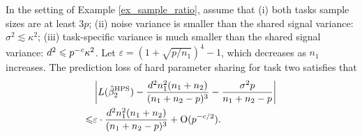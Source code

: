 \begin{corollary}\label{cor_MTL_loss}
	In the setting of Example \ref{ex_sample_ratio}, assume that
	(i) both tasks sample sizes are at least $3p$;
	(ii) noise variance is smaller than the shared signal variance: $\sigma^2 \lesssim  \kappa^2$;
	(iii) task-specific variance is much smaller than the shared signal variance: $d^2 \leqslant p^{-{\mathit{c}}}{\kappa^2}$.
	Let $\varepsilon = (1 + \sqrt{p/n_1})^ 4 - 1$, which decreases as $n_1$ increases.
	The prediction loss of hard parameter sharing for task two satisfies that
	\begin{align}\label{cor_MTL_error}
	  & \left|L(\hat{\beta}_2^{\textup{HPS}}) - \frac{d^2 n_1^2 (n_1 + n_2)}{(n_1 + n_2 - p)^3} -\frac{\sigma^2 p}{n_1 + n_2 - p}  \right| \\
	\leqslant& \varepsilon \cdot \frac{d^2 n_1^2 (n_1 + n_2)}{(n_1 + n_2 - p)^3} +  \operatorname{O}(p^{-c/2}).
	 \end{align}
	 \end{corollary}


